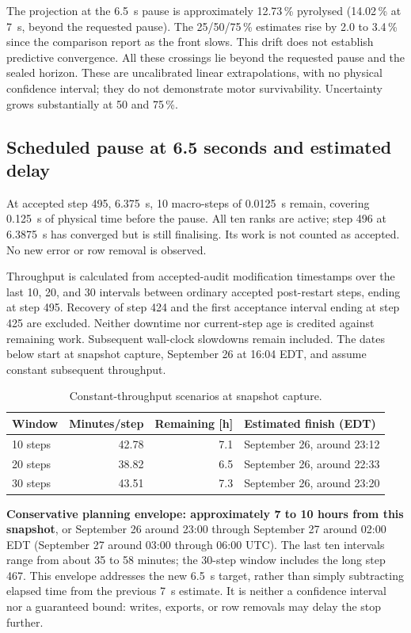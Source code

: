 The projection at the \SI{6.5}{s} pause is approximately 12.73\,\% pyrolysed
(14.02\,\% at \SI{7}{s}, beyond the requested pause). The
25/50/75\,\% estimates rise by 2.0 to 3.4\,\% since the comparison report
as the front slows. This drift does not establish predictive convergence. All these
crossings lie beyond the requested pause and the sealed horizon. These are uncalibrated
linear extrapolations, with no physical confidence interval; they do not
demonstrate motor survivability. Uncertainty grows substantially at 50 and
75\,\%.

\clearpage
\subsection{Scheduled pause at 6.5 seconds and estimated delay}
At accepted step 495, \SI{6.375}{s}, 10 macro-steps of
\SI{0.0125}{s} remain, covering \SI{0.125}{s} of physical time before the pause.
All ten ranks are active; step 496 at \SI{6.3875}{s} has converged but is still finalising.
Its work is not counted as accepted. No new error or row removal is observed.

Throughput is calculated from accepted-audit modification timestamps over
the last 10, 20, and 30 intervals between ordinary accepted post-restart steps,
ending at step 495. Recovery of step 424 and the first acceptance interval
ending at step 425 are excluded. Neither downtime nor current-step age is
credited against remaining work. Subsequent wall-clock slowdowns remain included.
The dates below start at snapshot capture, September 26 at 16:04 EDT,
and assume constant subsequent throughput.
\begin{table}[H]\centering
\caption{Constant-throughput scenarios at snapshot capture.}
\begin{tabular}{lrrl}\toprule
Window & Minutes/step & Remaining [h] & Estimated finish (EDT)\\\midrule
10 steps & 42.78 & 7.1 & September 26, around 23:12\\
20 steps & 38.82 & 6.5 & September 26, around 22:33\\
30 steps & 43.51 & 7.3 & September 26, around 23:20\\\bottomrule
\end{tabular}
\end{table}
\textbf{Conservative planning envelope: approximately 7 to 10 hours from
this snapshot}, or September 26 around 23:00 through September 27 around
02:00 EDT (September 27 around 03:00 through 06:00 UTC). The last ten intervals
range from about 35 to 58 minutes; the 30-step window includes the long step 467.
This envelope addresses the new \SI{6.5}{s} target, rather than simply
subtracting elapsed time from the previous \SI{7}{s} estimate.
It is neither a confidence interval nor a guaranteed bound: writes, exports,
or row removals may delay the stop further.

